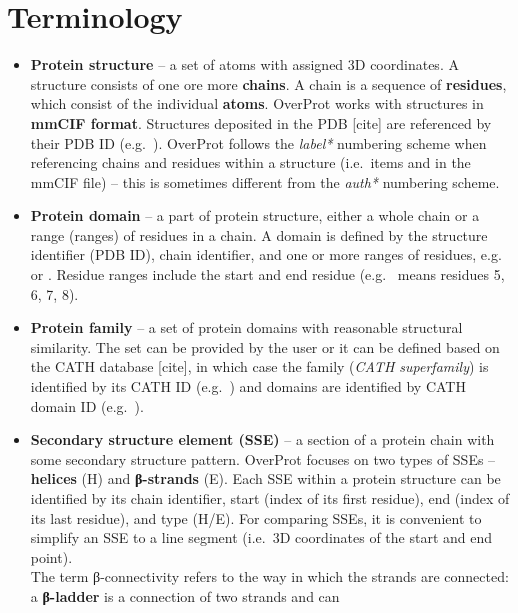 \documentclass{article}
\begin{document}
\section{Terminology}

\begin{itemize}
  \item
    \textbf{Protein structure} -- a set of atoms with assigned 3D
    coordinates. A structure consists of one ore more \textbf{chains}. A
    chain is a sequence of \textbf{residues}, which consist of the
    individual \textbf{atoms}. OverProt works with structures in
    \textbf{mmCIF format}. Structures deposited in the PDB {[}cite{]} are
    referenced by their PDB ID (e.g.~). OverProt follows the
    \emph{label*} numbering scheme when referencing chains and residues
    within a structure (i.e.~items  and
     in the mmCIF file) -- this is sometimes
    different from the \emph{auth*} numbering scheme.
  \item
    \textbf{Protein domain} -- a part of protein structure, either a
    whole chain or a range (ranges) of residues in a chain. A domain is
    defined by the structure identifier (PDB ID), chain identifier, and one or more
    ranges of residues, e.g.~ or
    . Residue ranges include the start and end
    residue (e.g.~ means residues 5, 6, 7, 8).
  \item
    \textbf{Protein family} -- a set of protein domains with reasonable
    structural similarity. The set can be provided by the user or it can
    be defined based on the CATH database {[}cite{]}, in which case the
    family (\emph{CATH superfamily}) is identified by its CATH ID
    (e.g.~) and domains are identified by CATH domain
    ID (e.g.~).
  \item
    \textbf{Secondary structure element (SSE)} -- a section of a protein
    chain with some secondary structure pattern. OverProt focuses on two
    types of SSEs -- \textbf{helices} (H) and \textbf{β-strands} (E). Each
    SSE within a protein structure can be identified by its chain
    identifier, start (index of its first residue), end (index of its last
    residue), and type (H/E). For comparing SSEs, it is convenient to simplify
    an SSE to a line segment (i.e.~3D coordinates of the start and end
    point).\\
    The term β-connectivity refers to the way in which the strands are
    connected: a \textbf{β-ladder} is a connection of two strands and can

\end{itemize}
\end{document}
